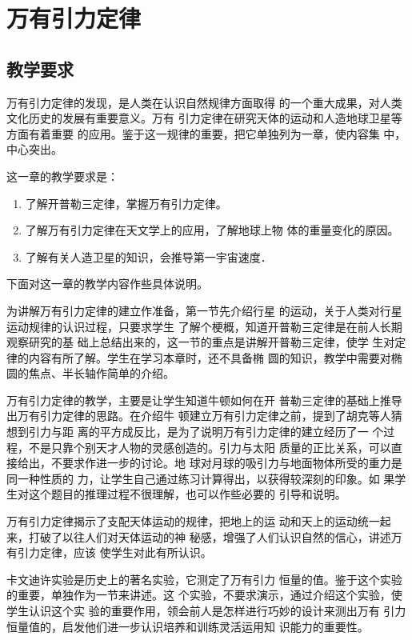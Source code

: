 \chapter{万有引力定律}\minitoc[n]
\section{教学要求}
万有引力定律的发现，是人类在认识自然规律方面取得
的一个重大成果，对人类文化历史的发展有重要意义。万有
引力定律在研究天体的运动和人造地球卫星等方面有着重要
的应用。鉴于这一规律的重要，把它单独列为一章，使内容集
中，中心突出。

这一章的教学要求是：
\begin{enumerate}
\item 了解开普勒三定律，掌握万有引力定律。
\item 了解万有引力定律在天文学上的应用，了解地球上物
体的重量变化的原因。
\item 了解有关人造卫星的知识，会推导第一宇宙速度．
\end{enumerate}

下面对这一章的教学内容作些具体说明。

为讲解万有引力定律的建立作准备，第一节先介绍行星
的运动，关于人类对行星运动规律的认识过程，只要求学生
了解个梗概，知道开普勒三定律是在前人长期观察研究的基
础上总结出来的，这一节的重点是讲解开普勒三定律，使学
生对定律的内容有所了解。学生在学习本章时，还不具备椭
圆的知识，教学中需要对椭圆的焦点、半长轴作简单的介绍。

万有引力定律的教学，主要是让学生知道牛顿如何在开
普勒三定律的基础上推导出万有引力定律的思路。在介绍牛
顿建立万有引力定律之前，提到了胡克等人猜想到引力与距
离的平方成反比，是为了说明万有引力定律的建立经历了一
个过程，不是只靠个别天才人物的灵感创造的。引力与太阳
质量的正比关系，可以直接给出，不要求作进一步的讨论。地
球对月球的吸引力与地面物体所受的重力是同一种性质的
力，让学生自己通过练习计算得出，以获得较深刻的印象。如
果学生对这个题目的推理过程不很理解，也可以作些必要的
引导和说明。

万有引力定律揭示了支配天体运动的规律，把地上的运
动和天上的运动统一起来，打破了以往人们对天体运动的神
秘感，增强了人们认识自然的信心，讲述万有引力定律，应该
使学生对此有所认识。

卡文迪许实验是历史上的著名实验，它测定了万有引力
恒量的值。鉴于这个实验的重要，单独作为一节来讲述。这
个实验，不要求演示，通过介绍这个实验，使学生认识这个实
验的重要作用，领会前人是怎样进行巧妙的设计来测出万有
引力恒量值的，启发他们进一步认识培养和训练灵活运用知
识能力的重要性。

